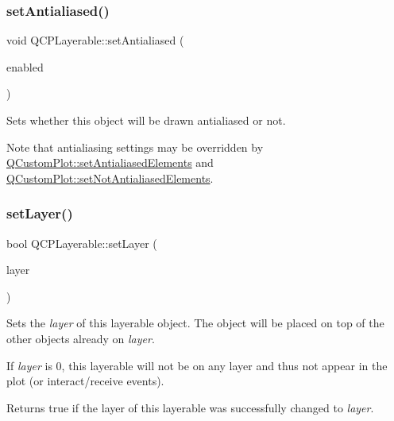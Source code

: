 \mbox{\label{class_q_c_p_layerable_a4fd43e89be4a553ead41652565ff0581}} 
\subsubsection{\texorpdfstring{set\+Antialiased()}{setAntialiased()}}
{\footnotesize\ttfamily void Q\+C\+P\+Layerable\+::set\+Antialiased (\begin{DoxyParamCaption}\item[{bool}]{enabled }\end{DoxyParamCaption})}

Sets whether this object will be drawn antialiased or not.

Note that antialiasing settings may be overridden by \hyperlink{class_q_custom_plot_af6f91e5eab1be85f67c556e98c3745e8}{Q\+Custom\+Plot\+::set\+Antialiased\+Elements} and \hyperlink{class_q_custom_plot_ae10d685b5eabea2999fb8775ca173c24}{Q\+Custom\+Plot\+::set\+Not\+Antialiased\+Elements}. \mbox{\label{class_q_c_p_layerable_ab0d0da6d2de45a118886d2c8e16d5a54}} 
\subsubsection{\texorpdfstring{set\+Layer()}{setLayer()}\hspace{0.1cm}{\footnotesize\ttfamily [1/2]}}
{\footnotesize\ttfamily bool Q\+C\+P\+Layerable\+::set\+Layer (\begin{DoxyParamCaption}\item[{\hyperlink{class_q_c_p_layer}{Q\+C\+P\+Layer} $\ast$}]{layer }\end{DoxyParamCaption})}

Sets the {\itshape layer} of this layerable object. The object will be placed on top of the other objects already on {\itshape layer}.

If {\itshape layer} is 0, this layerable will not be on any layer and thus not appear in the plot (or interact/receive events).

Returns true if the layer of this layerable was successfully changed to {\itshape layer}. \mbox{\label{class_q_c_p_layerable_ab25a0e7b897993b44447caee0f142083}} 
